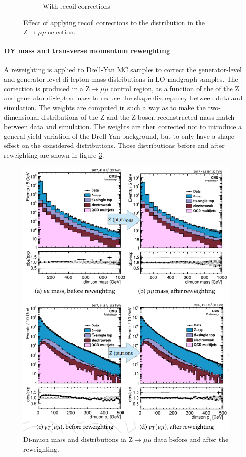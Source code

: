 \begin{figure}
\begin{subfigure}[b]{0.5\textwidth}
  \caption{\label{fig:recoil2} With recoil corrections}
\end{subfigure}
\caption{Effect of applying recoil corrections to the \MET distribution in the $\mathrm{Z}\rightarrow \mu\mu$ selection.}
\label{fig:recoilcorr}
\end{figure}

\paragraph{DY mass and transverse momentum reweighting} A reweighting is applied to Drell-Yan MC samples to correct the generator-level \pt and generator-level di-lepton mass distributions in LO madgraph samples. The correction is produced in a $\mathrm{Z}\rightarrow \mu\mu$ control region, as a function of the \pt of the $\mathrm{Z}$ and generator di-lepton mass to reduce the shape discrepancy between data and simulation. The weights are computed in such a way as to make the two-dimensional distributions of the $\mathrm{Z}$ \pt and the Z boson reconstructed mass match between data and simulation. The weights are then corrected not to introduce a general yield variation of the Drell-Yan background, but to only have a shape effect on the considered distributions. Those distributions before and after reweighting are shown in figure \ref{fig:DYreweight}.

\begin{figure}
    \centering
    \includegraphics[width=.7\textwidth]{Images/DYreweight.png}
    \caption{Di-muon mass and \pt distributions in $\mathrm{Z}\rightarrow \mu\mu$ data before and after the reweighting.}
    \label{fig:DYreweight}
\end{figure}

